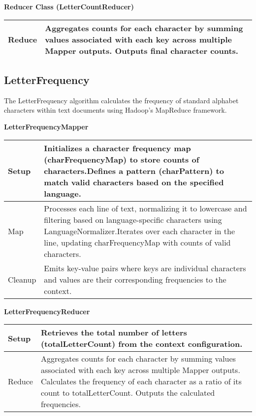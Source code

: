 \textbf{Reducer Class (LetterCountReducer)}
\begin{longtable}{|>{\raggedright\arraybackslash}p{}|>{\raggedright\arraybackslash}p{}|}
    \hline
    Reduce & Aggregates counts for each character by summing values associated with each key across multiple Mapper outputs. Outputs final character counts. \\
    \hline
\end{longtable}








\subsection{LetterFrequency}
The LetterFrequency algorithm calculates the frequency of standard alphabet characters within text documents using Hadoop's MapReduce framework.


\textbf{LetterFrequencyMapper}
\begin{longtable}{|>{\raggedright\arraybackslash}p{}|>{\raggedright\arraybackslash}p{}|}
    \hline
    Setup & Initializes a character frequency map (charFrequencyMap) to store counts of characters.Defines a pattern (charPattern) to match valid characters based on the specified language. \\
    \hline
    Map & Processes each line of text, normalizing it to lowercase and filtering based on language-specific characters using LanguageNormalizer.Iterates over each character in the line, updating charFrequencyMap with counts of valid characters.\\
    \hline
    Cleanup & Emits key-value pairs where keys are individual characters and values are their corresponding frequencies to the context.
    \\
    \hline
\end{longtable}


\textbf{LetterFrequencyReducer}
\begin{longtable}{|>{\raggedright\arraybackslash}p{}|>{\raggedright\arraybackslash}p{}|}
    \hline
    Setup & Retrieves the total number of letters (totalLetterCount) from the context configuration. \\
    \hline
    Reduce & Aggregates counts for each character by summing values associated with each key across multiple Mapper outputs.
    Calculates the frequency of each character as a ratio of its count to totalLetterCount.
    Outputs the calculated frequencies.\\
    \hline
\end{longtable}













